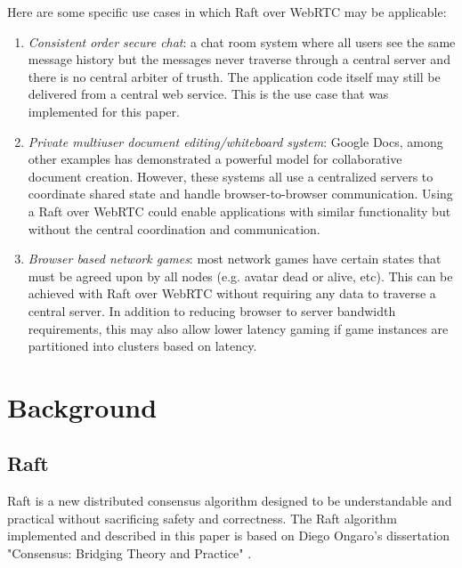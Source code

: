 \documentclass[9pt]{extarticle}
\begin{document}
\begin{multicols}{2}
Here are some specific use cases in which Raft over WebRTC may be
applicable:

\begin{enumerate}
\item \emph{Consistent order secure chat}: a chat room system where
    all users see the same message history but the messages never
    traverse through a central server and there is no central arbiter
    of trusth. The application code itself may still be delivered from
    a central web service. This is the use case that was implemented
    for this paper.
\item \emph{Private multiuser document editing/whiteboard system}:
    Google Docs, among other examples has demonstrated a powerful
    model for collaborative document creation. However, these systems
    all use a centralized servers to coordinate shared state and
    handle browser-to-browser communication. %
    Using a Raft over WebRTC could enable applications with similar
    functionality but without the central coordination and
    communication.
\item \emph{Browser based network games}: most network games have
    certain states that must be agreed upon by all nodes (e.g. avatar
    dead or alive, etc). This can be achieved with Raft over WebRTC
    without requiring any data to traverse a central server. In
    addition to reducing browser to server bandwidth requirements,
    this may also allow lower latency gaming if game instances are
    partitioned into clusters based on latency.
\end{enumerate}

\section{Background}

\subsection{Raft}

Raft is a new distributed consensus algorithm designed to be
understandable and practical without sacrificing safety and
correctness. The Raft algorithm implemented and described in this
paper is based on Diego Ongaro's dissertation "Consensus: Bridging
Theory and Practice" \cite{raft_thesis:ongaro14}.


\end{multicols}
\end{document}

